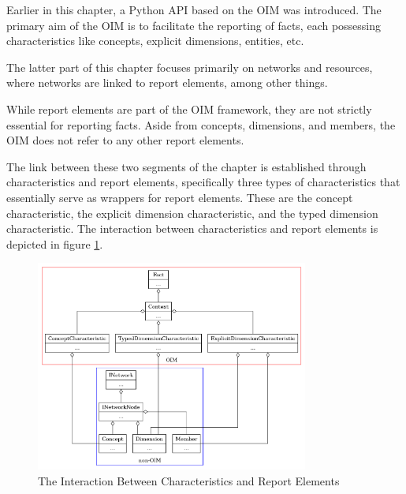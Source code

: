 Earlier in this chapter, a Python API based on the OIM was introduced. 
The primary aim of the OIM is to facilitate the reporting of facts, each possessing characteristics like concepts, explicit dimensions, entities, etc.

The latter part of this chapter focuses primarily on networks and resources, where networks are linked to report elements, among other things.

While report elements are part of the OIM framework, they are not strictly essential for reporting facts. 
Aside from concepts, dimensions, and members, the OIM does not refer to any other report elements.

The link between these two segments of the chapter is established through characteristics and report elements, 
specifically three types of characteristics that essentially serve as wrappers for report elements. 
These are the concept characteristic, the explicit dimension characteristic, and the typed dimension characteristic. 
The interaction between characteristics and report elements is depicted in figure \ref{fig:brel_combine_api}.

\begin{figure}[H]
    \centering
    \includegraphics[width=0.8\textwidth]{images/brel_combine_api.png}
    \caption{The Interaction Between Characteristics and Report Elements}
    \label{fig:brel_combine_api}
\end{figure}

